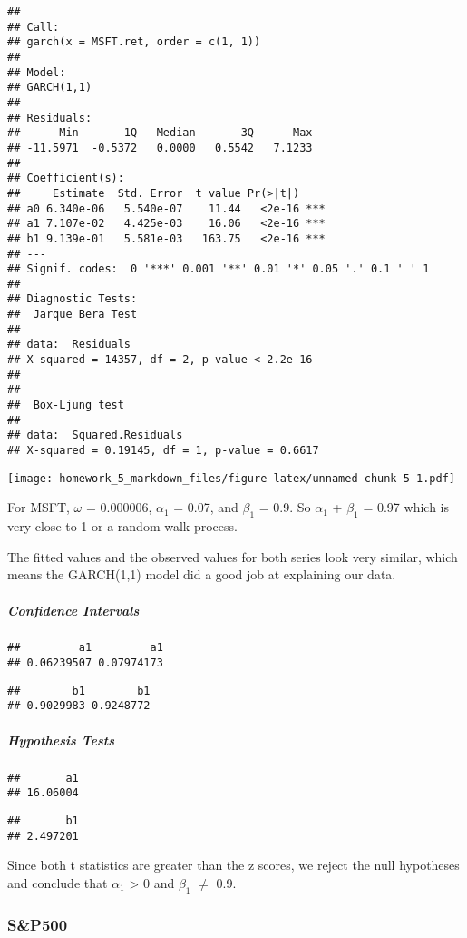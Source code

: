 \documentclass[]{article}
\let\oldsubparagraph\subparagraph
\renewcommand{\subparagraph}[1]{\oldsubparagraph{#1}\mbox{}}
\begin{document}
\begin{verbatim}
## 
## Call:
## garch(x = MSFT.ret, order = c(1, 1))
## 
## Model:
## GARCH(1,1)
## 
## Residuals:
##      Min       1Q   Median       3Q      Max 
## -11.5971  -0.5372   0.0000   0.5542   7.1233 
## 
## Coefficient(s):
##     Estimate  Std. Error  t value Pr(>|t|)    
## a0 6.340e-06   5.540e-07    11.44   <2e-16 ***
## a1 7.107e-02   4.425e-03    16.06   <2e-16 ***
## b1 9.139e-01   5.581e-03   163.75   <2e-16 ***
## ---
## Signif. codes:  0 '***' 0.001 '**' 0.01 '*' 0.05 '.' 0.1 ' ' 1
## 
## Diagnostic Tests:
##  Jarque Bera Test
## 
## data:  Residuals
## X-squared = 14357, df = 2, p-value < 2.2e-16
## 
## 
##  Box-Ljung test
## 
## data:  Squared.Residuals
## X-squared = 0.19145, df = 1, p-value = 0.6617
\end{verbatim}

\texttt{[image: homework\_5\_markdown\_files/figure-latex/unnamed-chunk-5-1.pdf]}

For MSFT, \(\omega\) = 0.000006, \(\alpha_1\) = 0.07, and \(\beta_1\) =
0.9. So \(\alpha_1\) + \(\beta_1\) = 0.97 which is very close to 1 or a
random walk process.

The fitted values and the observed values for both series look very
similar, which means the GARCH(1,1) model did a good job at explaining
our data.

\subparagraph{Confidence Intervals}\label{confidence-intervals}

\begin{verbatim}
##         a1         a1 
## 0.06239507 0.07974173
\end{verbatim}

\begin{verbatim}
##        b1        b1 
## 0.9029983 0.9248772
\end{verbatim}

\subparagraph{Hypothesis Tests}\label{hypothesis-tests}

\begin{verbatim}
##       a1 
## 16.06004
\end{verbatim}

\begin{verbatim}
##       b1 
## 2.497201
\end{verbatim}

Since both t statistics are greater than the z scores, we reject the
null hypotheses and conclude that \(\alpha_1\) \textgreater{} 0 and
\(\beta_1\) \(\neq\) 0.9.

\subsubsection{S\&P500}\label{sp500}
\end{document}
